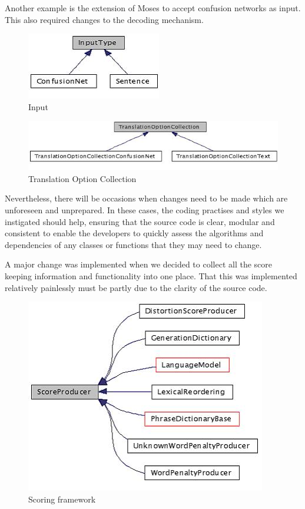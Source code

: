 \documentclass[11pt]{report}
\theoremstyle{plain}
\begin{document}
{Another example is the extension of Moses to accept confusion networks as input. This also required changes to the decoding mechanism.

\begin{figure}[h]
\begin{center}
\centering
\includegraphics[scale=1]{hieu-3}
\end{center}
\caption{Input}
\end{figure}

\begin{figure}[h]
\begin{center}
\centering
\includegraphics[scale=0.8]{hieu-4}
\caption{Translation Option Collection}
\end{center}
\end{figure}

Nevertheless, there will be occasions when changes need to be made which are unforeseen and unprepared. In these cases, the coding practises and styles we instigated should help, ensuring that the source code is clear, modular and consistent to enable the developers to quickly assess the algorithms and dependencies of any classes or functions that they may need to change.

A major change was implemented when we decided to collect all the score keeping information and functionality into one place. That this was implemented relatively painlessly must be partly due to the clarity of the source code.

\begin{figure}[h]
\begin{center}
\centering
\includegraphics[scale=0.8]{hieu-5}
\caption{Scoring framework}
\end{center}
\end{figure}

}
\end{document}
